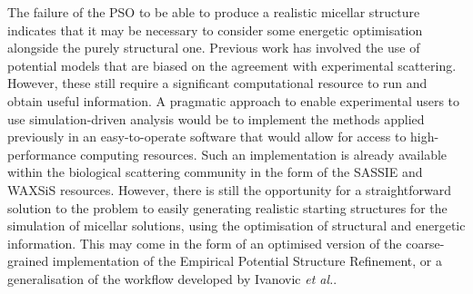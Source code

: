 The failure of the PSO to be able to produce a realistic micellar structure indicates that it may be necessary to consider some energetic optimisation alongside the purely structural one.
Previous work has involved the use of potential models that are biased on the agreement with experimental scattering.\autocite{hargreaves_atomistic_2011,soper_coarse-grained_2017,ivanovic_temperature-dependent_2018}
However, these still require a significant computational resource to run and obtain useful information.
A pragmatic approach to enable experimental users to use simulation-driven analysis would be to implement the methods applied previously in an easy-to-operate software that would allow for access to high-performance computing resources.
Such an implementation is already available within the biological scattering community in the form of the SASSIE\autocite{perkins_atomistic_2016} and WAXSiS\autocite{knight_waxsis_2015} resources.
However, there is still the opportunity for a straightforward solution to the problem to easily generating realistic starting structures for the simulation of micellar solutions, using the optimisation of structural and energetic information.
This may come in the form of an optimised version of the coarse-grained implementation of the Empirical Potential Structure Refinement,\autocite{soper_coarse-grained_2017} or a generalisation of the workflow developed by Ivanovic \emph{et al.}.\autocite{ivanovic_temperature-dependent_2018}

